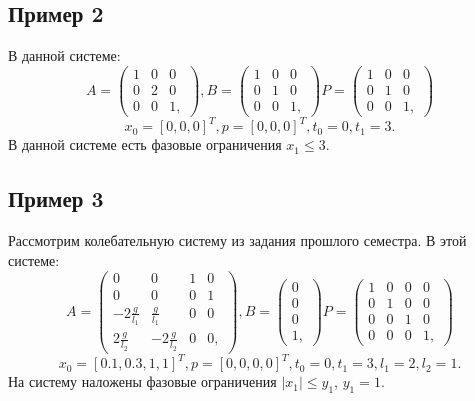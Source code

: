 \documentclass[a4paper, 14pt]{article}
\begin{document}
	\subsection{Пример 2}
	В данной системе:
	$$A =
	\begin{pmatrix}
		1 & 0 & 0 \\
		0 & 2 & 0 \\
		0 & 0 & 1,
	\end{pmatrix}, 
	B = 
	\begin{pmatrix}
		1 & 0 & 0 \\
		0 & 1 & 0 \\
		0 & 0 & 1,
	\end{pmatrix}
	P = 
	\begin{pmatrix}
		1 & 0 & 0 \\
		0 & 1 & 0 \\
		0 & 0 & 1,
	\end{pmatrix}
	$$	
	$$
		x_0 = [0, 0, 0]^{T}, p = [0, 0, 0]^{T}, t_0 = 0, t_1 = 3.
	$$
	В данной системе есть фазовые ограничения $x_1 \leqslant 3$.
		
	\subsection{Пример 3}
		Рассмотрим колебательную систему из задания прошлого семестра. В этой системе:
	$$A =
	\begin{pmatrix}
		0 & 0 & 1 & 0 \\
		0 & 0 & 0 & 1 \\
		-2 \frac{g}{l_1} & \frac{g}{l_1} & 0 & 0 \\
		2 \frac{g}{l_2} & -2\frac{g}{l_2} & 0 & 0,
	\end{pmatrix}, 
	B = 
	\begin{pmatrix}
		0 \\
		0 \\
		0 \\ 
		1, 
	\end{pmatrix}
	P = 
	\begin{pmatrix}
		1 & 0 & 0 & 0 \\
		0 & 1 & 0 & 0\\
		0 & 0 & 1 & 0 \\
		0 & 0 & 0 & 1,
	\end{pmatrix}
	$$	
	$$
		x_0 = [0.1, 0.3, 1, 1]^{T}, p = [0, 0, 0, 0]^{T}, t_0 = 0, t_1 = 3, l_1 = 2, l_2 = 1.
	$$		
	На систему наложены фазовые ограничения $|x_1| \leqslant y_1$,  $y_1 = 1$.
	
\end{document}
